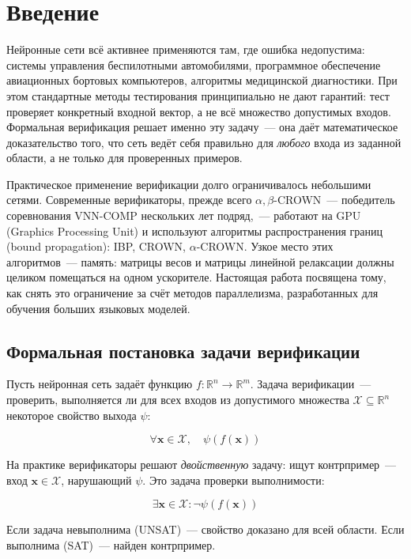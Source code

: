 \section*{Введение}

Нейронные сети всё активнее применяются там, где ошибка недопустима:
системы управления беспилотными автомобилями, программное обеспечение авиационных
бортовых компьютеров, алгоритмы медицинской диагностики.
При этом стандартные методы тестирования принципиально не дают гарантий:
тест проверяет конкретный входной вектор, а не всё множество допустимых входов.
Формальная верификация решает именно эту задачу~--- она даёт математическое
доказательство того, что сеть ведёт себя правильно для \emph{любого} входа
из заданной области, а не только для проверенных
примеров\cite{Guidotti2019Enhancing}.

Практическое применение верификации долго ограничивалось небольшими сетями.
Современные верификаторы, прежде всего $\alpha,\beta$-CROWN~--- победитель
соревнования VNN-COMP нескольких лет подряд,~--- работают на GPU (Graphics Processing Unit) и используют
алгоритмы распространения границ (bound propagation): IBP, CROWN,
$\alpha$-CROWN. Узкое место этих алгоритмов~--- память: матрицы весов
и матрицы линейной релаксации должны целиком помещаться на одном ускорителе.
Настоящая работа посвящена тому, как снять это ограничение за счёт методов
параллелизма, разработанных для обучения больших языковых моделей.

\subsection*{Формальная постановка задачи верификации}

Пусть нейронная сеть задаёт функцию
$f: \mathbb{R}^n \to \mathbb{R}^m$.
Задача верификации~--- проверить, выполняется ли для всех входов
из допустимого множества $\mathcal{X} \subseteq \mathbb{R}^n$ некоторое
свойство выхода $\psi$:

$$\forall \mathbf{x} \in \mathcal{X},\quad \psi(f(\mathbf{x}))$$

На практике верификаторы решают \emph{двойственную} задачу: ищут контрпример~---
вход $\mathbf{x} \in \mathcal{X}$, нарушающий $\psi$. Это задача проверки выполнимости:

$$\exists \mathbf{x} \in \mathcal{X} : \neg\psi(f(\mathbf{x}))$$

Если задача невыполнима (UNSAT)~--- свойство доказано для всей области.
Если выполнима (SAT)~--- найден контрпример\cite{marzari2025advancingneuralnetworkverification}.

